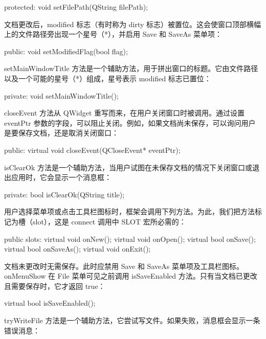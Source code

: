 \begin{codebox}
  protected:
    void setFilePath(QString filePath);
\end{codebox}

文档更改后，modified 标志（有时称为 dirty 标志）被置位。这会使窗口顶部横幅上的文件路径旁出现一个星号（*），并启用 Save 和 SaveAs 菜单项：

\begin{codebox}
  public:
    void setModifiedFlag(bool flag);
\end{codebox}

setMainWindowTitle 方法是一个辅助方法，用于拼出窗口的标题。它由文件路径以及一个可能的星号（*）组成，星号表示 modified 标志已置位：

\begin{codebox}
  private:
    void setMainWindowTitle();
\end{codebox}

closeEvent 方法从 QWidget 重写而来，在用户关闭窗口时被调用。通过设置 eventPtr 参数的字段，可以阻止关闭。例如，如果文档尚未保存，可以询问用户是要保存文档，还是取消关闭窗口：

\begin{codebox}
  public:
    virtual void closeEvent(QCloseEvent* eventPtr);
\end{codebox}

isClearOk 方法是一个辅助方法，当用户试图在未保存文档的情况下关闭窗口或退出应用时，它会显示一个消息框：

\begin{codebox}
  private:
    bool isClearOk(QString title);
\end{codebox}

用户选择菜单项或点击工具栏图标时，框架会调用下列方法。为此，我们把方法标记为槽（slot），这是 connect 调用中 SLOT 宏所必需的：

\begin{codebox}
  public slots:
    virtual void onNew();
    virtual void onOpen();
    virtual bool onSave();
    virtual bool onSaveAs();
    virtual void onExit();
\end{codebox}

文档未更改时无需保存。此时应禁用 Save 和 SaveAs 菜单项及工具栏图标。onMenuShow 在 File 菜单可见之前调用 isSaveEnabled 方法。只有当文档已更改且需要保存时，它才返回 true：

\begin{codebox}
    virtual bool isSaveEnabled();
\end{codebox}

tryWriteFile 方法是一个辅助方法，它尝试写文件。如果失败，消息框会显示一条错误消息：

